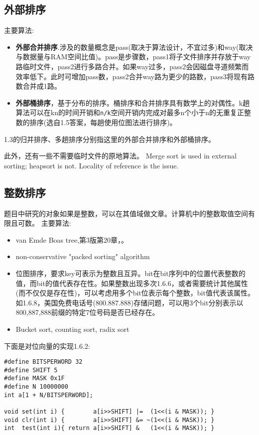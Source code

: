 \subsection{外部排序}
主要算法\cite{wikipedia}:
\begin{itemize}
    \item 
        \textbf{外部合并排序}\cite{wikipedia}.涉及的数量概念是pass(取决于算法设计，不宜过多)和way(取决与数据量与RAM空间比值)。pass是步骤数，pass1将子文件排序并存放于way路临时文件，pass2进行多路合并。如果way过多，pass2会因磁盘寻道频繁而效率低下。此时可增加pass数，pass2合并way路为更少的路数，pass3将现有路数合并成1路。
    \item 
	\textbf{外部桶排序}，基于分布的排序。桶排序和合并排序具有数学上的对偶性\cite{weijipedia}。k趟算法可以在kn的时间开销和\verb|n/k|空间开销内完成对最多n个小于n的无重复正整数的排序(选自\cite{pp}1.5答案，每趟使用位图法进行排序)。
\end{itemize}
\cite{pp}1.3的归并排序、多趟排序分别指这里的外部合并排序和外部桶排序。

此外，还有一些不需要临时文件的原地算法。 Merge sort is used in external sorting; heapsort is not. Locality of reference is the issue.



\subsection{整数排序}
\cite{wikipedia}
题目中研究的对象如果是整数，可以在其值域做文章。计算机中的整数取值空间有限且可数。
主要算法:
\begin{itemize}
    \item 
van Emde Boas tree,\cite{ita}第3版第20章，\cite{wikipedia}。
    \item 
non-conservative "packed sorting" algorithm
    \item 
	位图排序，要求key可表示为整数且互异。bit在bit序列中的位置代表整数的值，而bit的值代表存在性。如果整数出现多次\cite{pp}1.6.6，或者需要统计其他属性(而不仅仅是存在性)，可以考虑用多个bit位表示每个整数，bit值代表该属性。如\cite{pp}1.6.8，美国免费电话号(800.887.888)存储问题，可以用3个bit分别表示以800,887,888前缀的特定7位号码是否已经存在\cite{self}。
    \item 
Bucket sort, counting sort, radix sort
\end{itemize}

下面是对位向量的实现\cite{pp}1.6.2:
\begin{verbatim}
#define BITSPERWORD 32
#define SHIFT 5
#define MASK 0x1F
#define N 10000000
int a[1 + N/BITSPERWORD];

void set(int i) {        a[i>>SHIFT] |=  (1<<(i & MASK)); }
void clr(int i) {        a[i>>SHIFT] &= ~(1<<(i & MASK)); }
int  test(int i){ return a[i>>SHIFT] &   (1<<(i & MASK)); }
\end{verbatim}

